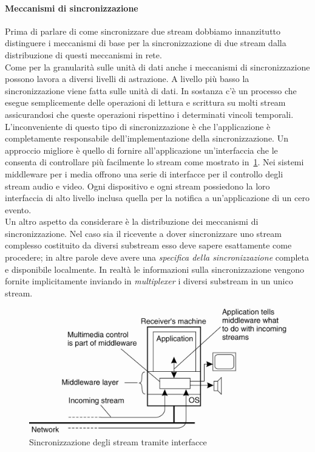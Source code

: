 \paragraph{Meccanismi di sincronizzazione}
Prima di parlare di come sincronizzare due stream dobbiamo innanzitutto distinguere i meccanismi di base per la sincronizzazione di due stream dalla distribuzione di questi meccanismi in rete.\\
Come per la granularità sulle unità di dati anche i meccanismi di sincronizzazione possono lavora a diversi livelli di astrazione. A livello più basso la sincronizzazione viene fatta sulle unità di dati. In sostanza c'è un processo che esegue semplicemente delle operazioni di lettura e scrittura su molti stream assicurandosi che queste operazioni rispettino i determinati vincoli temporali. L'inconveniente di questo tipo di sincronizzazione è che l'applicazione è completamente responsabile dell'implementazione della sincronizzazione. Un approccio migliore è quello di fornire all'applicazione un'interfaccia che le consenta di controllare più facilmente lo stream come mostrato in \figurename\,\ref{img:sincrostream}. Nei sistemi middleware per i media offrono una serie di interfacce per il controllo degli stream audio e video. Ogni dispositivo e ogni stream possiedono la loro interfaccia di alto livello inclusa quella per la notifica a un'applicazione di un cero evento.\\
Un altro aspetto da considerare è la distribuzione dei meccanismi di sincronizzazione. Nel caso sia il ricevente a dover sincronizzare uno stream complesso costituito da diversi substream esso deve sapere esattamente come procedere; in altre parole deve avere una \emph{specifica della sincronizzazione} completa e disponibile localmente. In realtà le informazioni sulla sincronizzazione vengono fornite implicitamente inviando in \emph{multiplexer} i diversi substream in un unico stream.
\begin{figure}
\centering
\includegraphics[scale=0.35]{img/sincrostream.png}
\caption{Sincronizzazione degli stream tramite interfacce}\label{img:sincrostream}
\end{figure}
